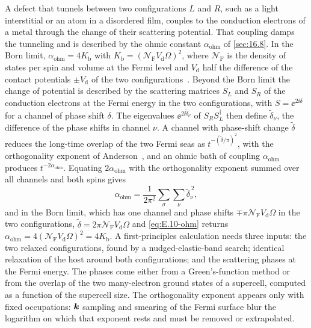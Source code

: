 A defect that tunnels between two configurations $L$ and $R$, such as a light interstitial or an atom in a disordered film, couples to the conduction electrons of a metal through the change of their scattering potential. That coupling damps the tunneling and is described by the ohmic constant $\alpha_{\mathrm{ohm}}$ of \cref{sec:16.8}. In the Born limit, $\alpha_{\mathrm{ohm}} = 4K_{\mathrm{b}}$ with $K_{\mathrm{b}} = (\mathcal{N}_{\mathrm{F}}V_{\mathrm{d}}\Omega)^2$, where $\mathcal{N}_{\mathrm{F}}$ is the density of states per spin and volume at the Fermi level and $V_{\mathrm{d}}$ half the difference of the contact potentials $\pm V_{\mathrm{d}}$ of the two configurations~\cite[Eq.~(4)]{maillet2023nanomechanical}. Beyond the Born limit the change of potential is described by the scattering matrices $S_L$ and $S_R$ of the conduction electrons at the Fermi energy in the two configurations, with $S = \ee^{2\ii\delta}$ for a channel of phase shift $\delta$. The eigenvalues $\ee^{2\ii\tilde\delta_\nu}$ of $S_RS_L^\dagger$ then define $\tilde\delta_\nu$, the difference of the phase shifts in channel $\nu$. A channel with phase-shift change $\tilde\delta$ reduces the long-time overlap of the two Fermi seas as $t^{-(\tilde\delta/\pi)^2}$, with the orthogonality exponent of Anderson~\cite{anderson1967infrared}, and an ohmic bath of coupling $\alpha_{\mathrm{ohm}}$ produces $t^{-2\alpha_{\mathrm{ohm}}}$. Equating $2\alpha_{\mathrm{ohm}}$ with the orthogonality exponent summed over all channels and both spins gives
\begin{equation}
  \alpha_{\mathrm{ohm}} = \frac{1}{2\pi^2}\sum_\sigma\sum_\nu\tilde\delta_\nu^{\,2} ,
  \label{eq:E.10-ohm}
\end{equation}
and in the Born limit, which has one channel and phase shifts $\mp\pi\mathcal{N}_{\mathrm{F}}V_{\mathrm{d}}\Omega$ in the two configurations, $\tilde\delta = 2\pi\mathcal{N}_{\mathrm{F}}V_{\mathrm{d}}\Omega$ and \cref{eq:E.10-ohm} returns $\alpha_{\mathrm{ohm}} = 4(\mathcal{N}_{\mathrm{F}}V_{\mathrm{d}}\Omega)^2 = 4K_{\mathrm{b}}$. A first-principles calculation needs three inputs: the two relaxed configurations, found by a nudged-elastic-band search; identical relaxation of the host around both configurations; and the scattering phases at the Fermi energy. The phases come either from a Green's-function method or from the overlap of the two many-electron ground states of a supercell, computed as a function of the supercell size. The orthogonality exponent appears only with fixed occupations: $\bm{k}$ sampling and smearing of the Fermi surface blur the logarithm on which that exponent rests and must be removed or extrapolated.

